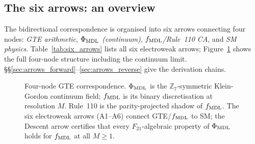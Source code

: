 \documentclass[11pt]{article}
\theoremstyle{remark}
\newcommand{\ZS}{\mathbb{Z}_7}
\newcommand{\Ngen}{N_{\rm gen}}
\newcommand{\fmdl}{f_{\rm MDL}}
\newcommand{\sinwsq}{\sin^2\!\theta_W}
\newcommand{\lam}{\lambda}
\newcommand{\phimdl}{\Phi_{\rm MDL}}
\newcommand{\Ftwentyone}{F_{21}}
\newcommand{\epszero}{\varepsilon_0}
\begin{document}
\subsection{The six arrows: an overview}
\label{sec:arrows_overview}

The bidirectional correspondence is organised into six arrows connecting four nodes:
\emph{GTE arithmetic}, \emph{$\phimdl$ (continuum)}, \emph{$\fmdl$/Rule~110 CA}, and
\emph{SM physics}.
Table~\ref{tab:six_arrows} lists all six electroweak arrows;
Figure~\ref{fig:four_nodes} shows the full four-node structure including the
continuum limit.
\S\S\ref{sec:arrows_forward}--\ref{sec:arrows_reverse} give the derivation chains.

\begin{figure}[H]
\centering
{}
\caption{Four-node GTE correspondence.
  $\phimdl$ is the $\ZS$-symmetric Klein-Gordon continuum field;
  $\fmdl$ is its binary discretisation at resolution $M$.
  Rule~110 is the parity-projected shadow of $\fmdl$.
  The six electroweak arrows (A1--A6) connect GTE/$\fmdl$ to SM;
  the Descent arrow certifies that every $\Ftwentyone$-algebraic property
  of $\phimdl$ holds for $\fmdl$ at all $M \geq 1$.}
\label{fig:four_nodes}
\end{figure}
\end{document}
